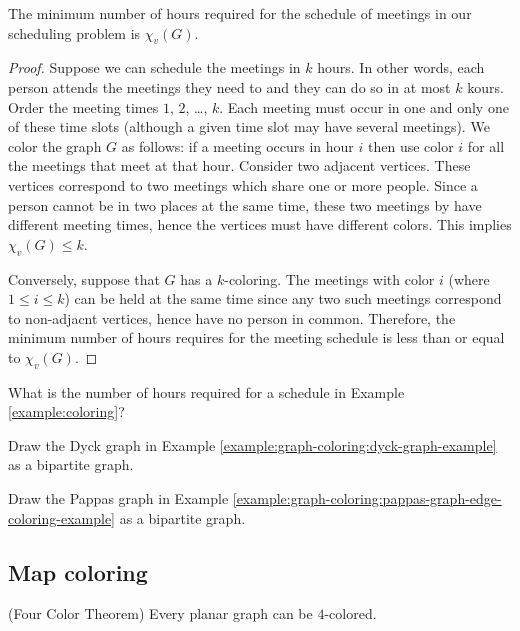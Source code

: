 \begin{theorem}
The minimum number of hours required for the schedule of meetings in
our scheduling problem is $\chi_v(G)$.
\end{theorem}

\begin{proof}

Suppose we can schedule the meetings in $k$ hours. In other words,
each person attends the meetings they need to and they
can do so in at most $k$ kours. Order the meeting
times $1$, $2$, \dots, $k$. Each meeting must occur in one and only
one of these time slots (although a given time slot may have
several meetings). We color the graph $G$ as follows:
if a meeting occurs in hour $i$ then use color $i$ for all the
meetings that meet at that hour. Consider two adjacent 
vertices. These vertices correspond to two meetings which 
share one or more people. Since a person cannot be in two places at
the same time, these two meetings by have different meeting times,
hence the vertices must have different colors. This implies
$\chi_v(G)\leq k$.

Conversely, suppose that $G$ has a $k$-coloring. 
The meetings with color $i$ (where $1\leq i\leq k$) 
can be held at the same time since any two such meetings
correspond to non-adjacnt vertices, hence have no
person in common. Therefore, the minimum number of 
hours requires for the meeting schedule is less than 
or equal to $\chi_v(G)$.

\end{proof}

\begin{problem}
\item
What is the number of hours required for a schedule
in Example \ref{example:coloring}?
\item
Draw the Dyck graph in Example \ref{example:graph-coloring:dyck-graph-example}
as a bipartite graph.

\item
Draw the Pappas graph in Example 
\ref{example:graph-coloring:pappas-graph-edge-coloring-example}
as a bipartite graph.
\end{problem}

\subsection{Map coloring}


\begin{theorem}
(Four Color Theorem)
Every planar graph can be $4$-colored.
\end{theorem}

